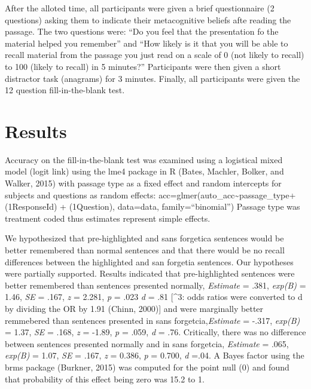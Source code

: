 \documentclass[doc]{apa6}
\begin{document}
After the alloted time, all participants were given a brief questionnaire (2 questions) asking them to indicate their metacognitive beliefs afte reading the passage. The two questions were: \enquote{Do you feel that the presentation fo the material helped you remember} and \enquote{How likely is it that you will be able to recall material from the passage you just read on a scale of 0 (not likely to recall) to 100 (likely to recall) in 5 minutes?} Participants were then given a short distractor task (anagrams) for 3 minutes. Finally, all participants were given the 12 question fill-in-the-blank test.

\hypertarget{results-1}{%
\section{Results}\label{results-1}}

Accuracy on the fill-in-the-blank test was examined using a logistical mixed model (logit link) using the lme4 package in R (Bates, Machler, Bolker, and Walker, 2015) with passage type as a fixed effect and random intercepts for subjects and questions as random effects: acc=glmer(auto\_acc\textasciitilde{}passage\_type+(1\textbar{}ResponseId) + (1\textbar{}Question), data=data, family=\enquote{binomial}) Passage type was treatment coded thus estimates represent simple effects.

We hypothesized that pre-highlighted and sans forgetica sentences would be better remembered than normal sentences and that there would be no recall differences between the highlighted and san forgetia sentences. Our hypotheses were partially supported. Results indicated that pre-highlighted sentences were better remembered than sentences presented normally, \emph{Estimate} = .381, \emph{exp(B)} = 1.46, \emph{SE} = .167, \emph{z} = 2.281, \emph{p} = .023 \emph{d} = .81 {[}\^{}3: odds ratios were converted to d by dividing the OR by 1.91 (Chinn, 2000){]} and were marginally better remmebered than sentences presented in sans forgetcia,\emph{Estimate} = -.317, \emph{exp(B)} = 1.37, \emph{SE} = .168, \emph{z} = -1.89, \emph{p} = .059, \emph{d} = .76. Critically, there was no difference between sentences presented normally and in sans forgetcia, \emph{Estimate} = .065, \emph{exp(B)} = 1.07, \emph{SE} = .167, \emph{z} = 0.386, \emph{p} = 0.700, \emph{d} =.04. A Bayes factor using the brms package (Burkner, 2015) was computed for the point null (0) and found that probability of this effect being zero was 15.2 to 1.
\end{document}
